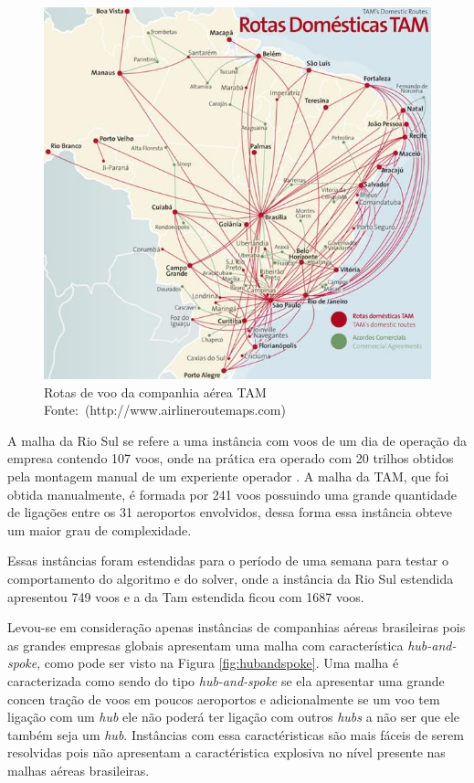 \begin{figure}[h]
\centering
\caption{Rotas de voo da companhia aérea TAM \newline \mbox{Fonte:
(http://www.airlineroutemaps.com) }}

\label{fig:malhatam}
\includegraphics[scale=0.45]{./img/tam_brazilian_airlines}
\end{figure}
	
A malha da Rio Sul se refere a uma instância com voos de um dia de operação da
empresa contendo 107 voos, onde na prática era operado com 20 trilhos
obtidos pela montagem manual de um experiente operador \cite{pontes2002}. A
malha da TAM, que foi obtida manualmente, é formada por 241 voos possuindo
uma grande quantidade de ligações entre os 31 aeroportos envolvidos, dessa
forma essa instância  obteve um maior grau de complexidade.

Essas instâncias foram estendidas para o período de uma semana para testar o
comportamento do algoritmo e do solver, onde a instância da Rio Sul
estendida apresentou 749 voos e a da Tam estendida ficou com 1687 voos.
	
Levou-se em consideração apenas instâncias de companhias aéreas brasileiras pois
as grandes empresas globais apresentam uma malha com característica
\textit{hub-and-spoke}, como pode ser visto na Figura \ref{fig:hubandspoke}. Uma
malha é caracterizada como sendo do tipo \textit{hub-and-spoke} se ela
apresentar uma grande concen tração de voos em poucos aeroportos e
adicionalmente se um voo tem ligação com um \textit{hub} ele não poderá ter
ligação com outros \textit{hubs} a não ser que ele também seja um \textit{hub}.
Instâncias com essa caractéristicas são mais fáceis de serem resolvidas pois
não apresentam a caractéristica explosiva no nível presente nas malhas aéreas brasileiras.
	
